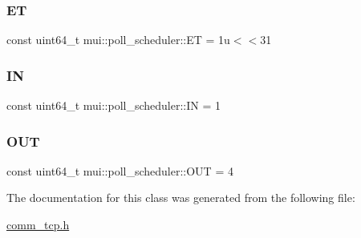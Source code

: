 \subsubsection{\texorpdfstring{ET}{ET}}
{\footnotesize\ttfamily const uint64\+\_\+t mui\+::poll\+\_\+scheduler\+::\+ET = 1u$<$$<$31\hspace{0.3cm}{\ttfamily [static]}}

\mbox{\label{classmui_1_1poll__scheduler_a2f3010dc0a5127b8daab44b0a04e95f7}} 
\subsubsection{\texorpdfstring{IN}{IN}}
{\footnotesize\ttfamily const uint64\+\_\+t mui\+::poll\+\_\+scheduler\+::\+IN = 1\hspace{0.3cm}{\ttfamily [static]}}

\mbox{\label{classmui_1_1poll__scheduler_ad3f840d4998ade0582bd21b703662bba}} 
\subsubsection{\texorpdfstring{O\+UT}{OUT}}
{\footnotesize\ttfamily const uint64\+\_\+t mui\+::poll\+\_\+scheduler\+::\+O\+UT = 4\hspace{0.3cm}{\ttfamily [static]}}



The documentation for this class was generated from the following file\+:\begin{DoxyCompactItemize}
\item 
\hyperlink{comm__tcp_8h}{comm\+\_\+tcp.\+h}\end{DoxyCompactItemize}
